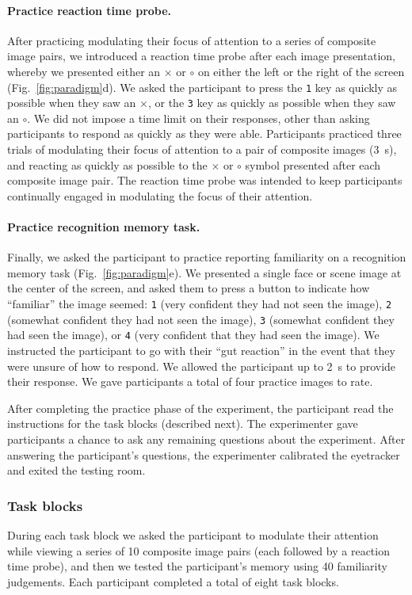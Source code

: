 \documentclass[english]{article}
\begin{document}
\paragraph{Practice reaction time probe.}
After practicing modulating their focus of attention to a series of composite image pairs, we introduced a reaction time probe after each image presentation, whereby we presented either an $\times$ or $\circ$ on either the left or the right of the screen (Fig.~\ref{fig:paradigm}d).  We asked the participant to press the \texttt{1} key as quickly as possible when they saw an $\times$, or the \texttt{3} key as quickly as possible when they saw an $\circ$.  We did not impose a time limit on their responses, other than asking participants to respond as quickly as they were able.  Participants practiced three trials of modulating their focus of attention to a pair of composite images (3~s), and reacting as quickly as possible to the $\times$ or $\circ$ symbol presented after each composite image pair.  The reaction time probe was intended to keep participants continually engaged in modulating the focus of their attention.

\paragraph{Practice recognition memory task.}
Finally, we asked the participant to practice reporting familiarity on a recognition memory task (Fig.~\ref{fig:paradigm}e).  We presented a single face or scene image at the center of the screen, and asked them to press a button to indicate how ``familiar'' the image seemed: \texttt{1} (very confident they had not seen the image), \texttt{2} (somewhat confident they had not seen the image), \texttt{3} (somewhat confident they had seen the image), or \texttt{4} (very confident that they had seen the image).  We instructed the participant to go with their ``gut reaction'' in the event that they were unsure of how to respond.  We allowed the participant up to 2~s to provide their response.  We gave participants a total of four practice images to rate.

After completing the practice phase of the experiment, the participant read the instructions for the task blocks (described next).  The experimenter gave participants a chance to ask any remaining questions about the experiment.  After answering the participant's questions, the experimenter calibrated the eyetracker and exited the testing room.

\subsubsection*{Task blocks}
During each task block we asked the participant to modulate their attention while viewing a series of 10 composite image pairs (each followed by a reaction time probe), and then we tested the participant's memory using 40 familiarity judgements.  Each participant completed a total of eight task blocks.
\end{document}
